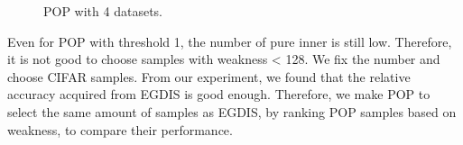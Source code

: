  \begin{figure}[H]
\centering  
{}
\caption{POP with 4 datasets.}
\label{Fig.clcifar10}
\end{figure}

Even for POP with threshold 1, the number of pure inner is still low. Therefore, it is not good to choose samples with weakness < 128. We fix the number and choose CIFAR samples. From our experiment, we found that the relative accuracy acquired from EGDIS is good enough. Therefore, we make POP to select the same amount of samples as EGDIS, by ranking POP samples based on weakness, to compare their performance.
 
